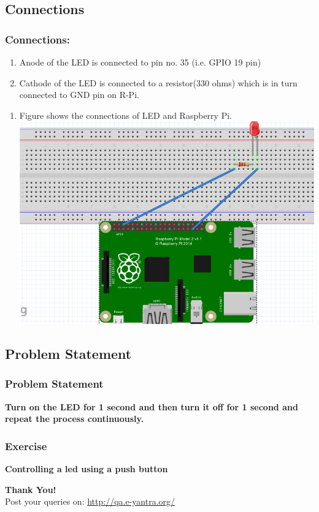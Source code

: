\documentclass[10pt,red]{beamer}
\begin{document}
\subsection{Connections}
\begin{frame}
	\frametitle{Connections:}
	\begin{enumerate}
		\item<+-|alert@+> Anode of the LED is connected to pin no. 35 (i.e. GPIO 19 pin)
		\item<+-|alert@+> Cathode of the LED is connected to a resistor(330 ohms) which is in turn connected to GND pin on R-Pi.
	\end{enumerate}
\end{frame}
\begin{frame}
	\begin{enumerate}
	\item	Figure shows the connections of LED and Raspberry Pi.
	\vspace{5mm}
	\includegraphics[scale=0.4]{gpio.png}
	\end{enumerate}	
\end{frame}
\subsection{Problem Statement}
\begin{frame}
	\frametitle{Problem Statement}
	\textbf{Turn on the LED for 1 second and then turn it off for 1 second and repeat the process continuously.}
\end{frame}
\begin{frame}
	\frametitle{Exercise} \pause
	\textbf{Controlling a led using a push button}
\end{frame}
\begin{frame}
\hskip4cm
\textbf{\LARGE Thank You!} \\[20pt]
\hskip3cm
\scriptsize Post your queries on: 
\hyperref[www.e-yantra.org]{\color{blue} http://qa.e-yantra.org/ \color{black}} 
\end{frame}
\end{document}
